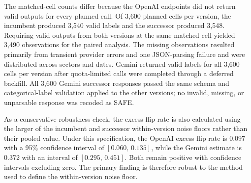 \documentclass[11pt]{article}
\begin{document}
The matched-cell counts differ because the OpenAI endpoints did not return valid outputs for every planned call. Of 3{,}600 planned cells per version, the incumbent produced 3{,}540 valid labels and the successor produced 3{,}548. Requiring valid outputs from both versions at the same matched cell yielded 3{,}490 observations for the paired analysis. The missing observations resulted primarily from transient provider errors and one JSON-parsing failure and were distributed across sectors and dates. Gemini returned valid labels for all 3{,}600 cells per version after quota-limited calls were completed through a deferred backfill. All 3{,}600 Gemini successor responses passed the same schema and categorical-label validation applied to the other versions; no invalid, missing, or unparsable response was recoded as SAFE.

As a conservative robustness check, the excess flip rate is also calculated using the larger of the incumbent and successor within-version noise floors rather than their pooled value. Under this specification, the OpenAI excess flip rate is 0.097 with a 95\% confidence interval of $[0.060,\,0.135]$, while the Gemini estimate is 0.372 with an interval of $[0.295,\,0.451]$. Both remain positive with confidence intervals excluding zero. The primary finding is therefore robust to the method used to define the within-version noise floor.
\end{document}
